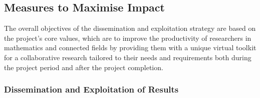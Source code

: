 \subsection{Measures to Maximise Impact}
The overall objectives of the dissemination and exploitation strategy are based on the project's core values, which are to improve the productivity of researchers in mathematics and connected fields by providing them with a unique virtual toolkit for a collaborative research tailored to their needs and requirements both during the project period and after the project completion.

\subsubsection{Dissemination and Exploitation of Results}
\label{subsubsect:dissemination}
